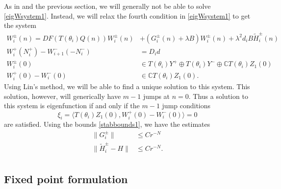 \documentclass[12pt]{elsarticle}
\def\C{{\mathbb C}}
\begin{document}
As in \cite{Sandstede1998} and the previous section, we will generally not be able to solve \cref{eigWsystem1}. Instead, we will relax the fourth condition in \cref{eigWsystem1} to get the system
\begin{align}
W_i^\pm(n) = DF(T(\theta_i) Q(n) ) W_i^\pm(n) &+ (G_i^\pm(n) + \lambda B) W_i^\pm(n) + \lambda^2 d_i B \tilde{H}_i^\pm(n) \label{eigsystem1} \\
W_i^+(N_i^+) - W_{i+1}^-(-N_i^-) &= D_i d \label{eigsystem2} \\
W_i^\pm(0) &\in T(\theta_i) Y^+ \oplus T(\theta_i) Y^- \oplus \C T(\theta_i) Z_1(0) \label{eigsystem3a} \\
W_i^+(0) - W_i^-(0) &\in \C T(\theta_i) Z_1(0). \label{eigsystem3b} 
\end{align}
Using Lin's method, we will be able to find a unique solution to this system. This solution, however, will generically have $m-1$ jumps at $n = 0$. Thus a solution to this system is eigenfunction if and only if the $m-1$ jump conditions
\begin{equation*}
\xi_i = \langle T(\theta_i) Z_1(0), W_i^+(0) - W_i^-(0) \rangle = 0
\end{equation*}
are satisfied. Using the bounds \cref{stabbounds1}, we have the estimates
\begin{equation}\label{stabbounds2}
\begin{aligned}
\|G_i^\pm\| &\leq C r^{-N} \\
\|\tilde{H}_i^\pm - H\| &\leq C r^{-N}. \\
\end{aligned}
\end{equation}

\subsection{Fixed point formulation}
\end{document}
